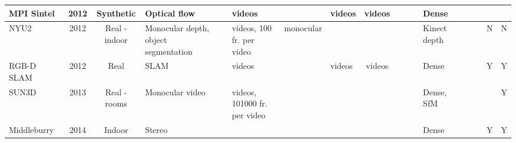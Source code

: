 \documentclass[10pt,journal,compsoc]{IEEEtran}
\begin{document}
\begin{table*}[t]
{\begin{tabular}{@{}p{8.5em}@{ }c@{ } c@{ }p{11.915em}c@{ }p{7.5em}@{ }p{5.335em}@{ }p{5.5em}c@{ }c@{ }l@{ }p{8.665em}lll @{ }l  @{ }l@{ }l@{}}
    \hline
      {MPI Sintel~\cite{butler2012naturalistic} } & \multicolumn{1}{c}{2012} & \multicolumn{1}{p{7em}}{Synthetic} & \multicolumn{1}{p{11.915em}}{Optical flow} & \multicolumn{1}{c}{} & \multicolumn{1}{p{7.5em}}{ videos} & \multicolumn{1}{p{5.335em}}{ } & \multicolumn{1}{p{5.585em}}{ videos} & \multicolumn{1}{p{4.335em}}{ videos} & & \multicolumn{1}{l}{} & \multicolumn{1}{l}{} & Dense &  &  & & \multicolumn{1}{r}{} & \multicolumn{1}{r}{} \\

    \hline

   {NYU2~\cite{silberman2012indoor}} & \multicolumn{1}{c}{2012} & \multicolumn{1}{p{7em}}{Real - indoor} & \multicolumn{1}{p{11.915em}}{Monocular depth, object segmentation} & \multicolumn{1}{c}{ } & \multicolumn{1}{p{7.5em}}{ videos, 100  fr. per video} & \multicolumn{1}{p{5.335em}}{ monocular} & \multicolumn{1}{p{5.585em}}{} & \multicolumn{1}{c}{} & & \multicolumn{1}{l}{} & \multicolumn{1}{l}{} & Kinect depth &  &  & & \multicolumn{1}{l}{N} & \multicolumn{1}{l}{N} \\
    \hline

   {RGB-D SLAM~\cite{sturm2012benchmark}} & \multicolumn{1}{c}{2012} & \multicolumn{1}{p{7em}}{Real} & \multicolumn{1}{p{11.915em}}{SLAM} & \multicolumn{1}{c}{} & \multicolumn{1}{p{7.5em}}{ videos} & \multicolumn{1}{c}{} & \multicolumn{1}{p{5.585em}}{ videos} & \multicolumn{1}{c}{ videos} & &  \multicolumn{1}{l}{} & \multicolumn{1}{l}{} & Dense &  &  & & \multicolumn{1}{l}{Y} & \multicolumn{1}{l}{Y} \\
       \hline

    {SUN3D~\cite{xiao2013sun3d}} & \multicolumn{1}{c}{2013} & \multicolumn{1}{p{7em}}{Real - rooms} & \multicolumn{1}{p{11.915em}}{Monocular video} & \multicolumn{1}{c}{} & \multicolumn{1}{p{7.5em}}{ videos, 101000 fr. per video} & \multicolumn{1}{p{5.335em}}{} & \multicolumn{1}{p{5.585em}}{} & \multicolumn{1}{c}{} & & \multicolumn{1}{l}{} & \multicolumn{1}{l}{} & Dense, SfM &  &  & & \multicolumn{1}{r}{} & \multicolumn{1}{l}{Y} \\ 
    
       \hline
    Middleburry~\cite{scharstein2014high} & 2014  &  \multicolumn{1}{p{7em}}{Indoor} &  \multicolumn{1}{p{8em}}{Stereo} &  & \multicolumn{1}{p{7.5em}}{} &  \multicolumn{1}{p{5.335em}}{} &  \multicolumn{1}{p{5.585em}}{} &  {}  & & \multicolumn{1}{l}{} & \multicolumn{1}{l}{} & Dense &     &  & &  \multicolumn{1}{l}{Y}     &  \multicolumn{1}{l}{Y} \\
    

\end{tabular}}
\end{table*}
\end{document}

